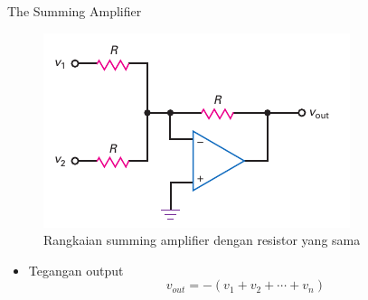 \begin{frame}{The Summing Amplifier}
	\begin{multicols}{2}
		\begin{figure}
			\centering
			\includegraphics[width=\linewidth]{gambar/fig-16.23b}
			\caption{Rangkaian summing amplifier dengan resistor yang sama}
			\label{fig-16.23b}
		\end{figure}
		\columnbreak
		\begin{itemize}
			\item Tegangan output
			\begin{equation*}
				v_{out} = -(v_1 + v_2 + \cdots + v_n)
			\end{equation*}
		\end{itemize}
	\end{multicols}
\end{frame}

